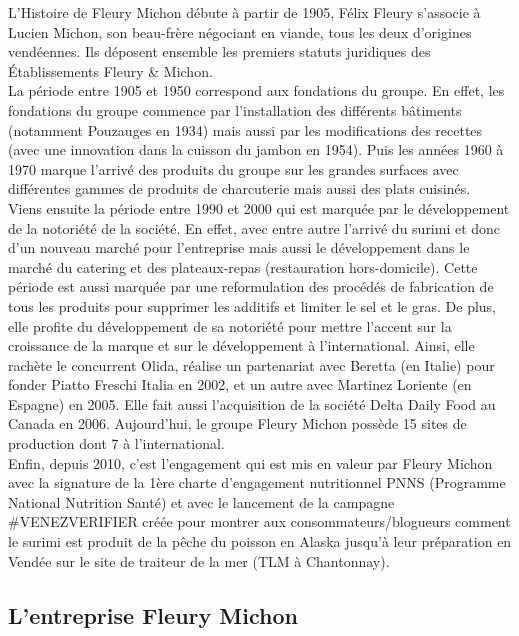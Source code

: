 \documentclass[a4paper,12pt]{extarticle}
\begin{document}
	L’Histoire de Fleury Michon débute à partir de 1905, Félix Fleury s'associe à Lucien Michon, son beau-frère négociant en viande, tous les deux d’origines vendéennes. Ils déposent ensemble les premiers statuts juridiques des Établissements Fleury \& Michon.\\
    La période entre 1905 et 1950 correspond aux fondations du groupe. En effet, les fondations du groupe commence par l’installation des différents bâtiments (notamment Pouzauges en 1934) mais aussi par les modifications des recettes (avec une innovation dans la cuisson du jambon en 1954).
Puis les années 1960 à 1970 marque l’arrivé des produits du groupe sur les grandes surfaces avec différentes gammes de produits de charcuterie mais aussi des plats cuisinés.\\
    Viens ensuite la période entre 1990 et 2000 qui est marquée par le développement de la notoriété de la société. En effet, avec entre autre l’arrivé du surimi et donc d’un nouveau marché pour l’entreprise mais aussi le développement dans le marché du catering et des plateaux-repas (restauration hors-domicile). Cette période est aussi marquée par une reformulation des procédés de fabrication de tous les produits pour supprimer les additifs et limiter le sel et le gras. De plus, elle profite du développement de sa notoriété pour mettre l’accent sur la croissance de la marque et sur le développement à l'international. Ainsi, elle rachète le concurrent Olida, réalise un partenariat avec Beretta (en Italie) pour fonder Piatto Freschi Italia en 2002, et un autre avec Martinez Loriente (en Espagne) en 2005. Elle fait aussi l'acquisition de la société Delta Daily Food au Canada en 2006. Aujourd’hui, le groupe Fleury Michon possède 15 sites de production dont 7 à l'international.\\
    Enfin, depuis 2010, c’est l’engagement qui est mis en valeur par Fleury Michon avec la signature de la 1ère charte d’engagement nutritionnel PNNS (Programme National Nutrition Santé) et avec le lancement de la campagne \#VENEZVERIFIER créée pour montrer aux consommateurs/blogueurs comment le surimi est produit de la pêche du poisson en Alaska jusqu'à leur préparation en Vendée sur le site de traiteur de la mer (TLM à Chantonnay).\\
	
	\subsection{L’entreprise Fleury Michon}
		\paragraph{}
			
\end{document}
